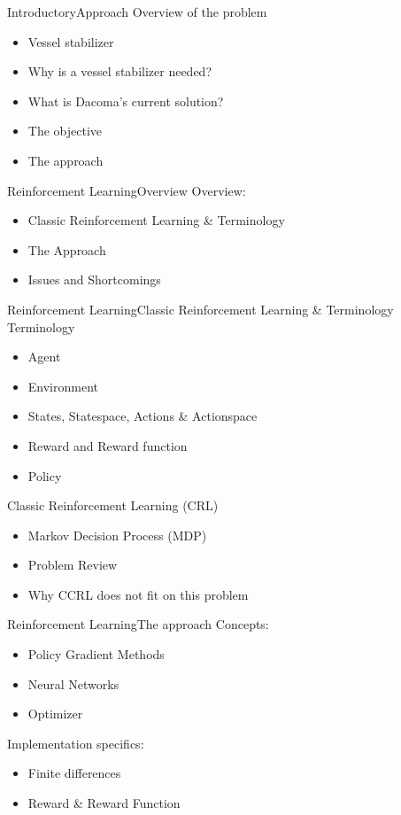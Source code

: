 \documentclass[aspectratio=169,10pt,t]{beamer}
\begin{document}
\begin{frame}{Introductory}{Approach\vphantom{(y}}
\vspace{-0.7em}
Overview of the problem
\begin{itemize}
\item Vessel stabilizer
\item Why is a vessel stabilizer needed?
\item What is Dacoma's current solution?
\item The objective
\item {\color{blue}The approach}
\end{itemize}
\end{frame}


\begin{frame}{Reinforcement Learning}{Overview\vphantom{(y}}
\vspace{-0.7em}
Overview:
\begin{itemize}
\item Classic Reinforcement Learning \& Terminology
\item The Approach
\item Issues and Shortcomings
\end{itemize}
\end{frame}

\begin{frame}{Reinforcement Learning}{Classic Reinforcement Learning \& Terminology\vphantom{(y}}
\vspace{-0.7em}
Terminology
\begin{itemize}
\item Agent
\item Environment
\item States, Statespace, Actions \& Actionspace
\item Reward and Reward function
\item Policy
\end{itemize}

Classic Reinforcement Learning (CRL)
\begin{itemize}
  \item Markov Decision Process (MDP)
  \item Problem Review
  \item Why CCRL does not fit on this problem 
\end{itemize}
\end{frame}

\begin{frame}{Reinforcement Learning}{The approach\vphantom{(y}}
\vspace{-0.7em}
Concepts:
\begin{itemize}
\item Policy Gradient Methods
\item Neural Networks
\item Optimizer
\end{itemize}
Implementation specifics:
\begin{itemize}
  \item Finite differences
  \item Reward \& Reward Function
\end{itemize}
\end{frame}
\end{document}
